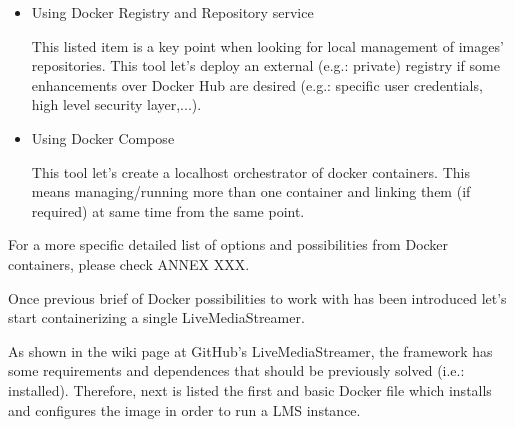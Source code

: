 \begin{itemize}
\begin{itemize}
	\item Using Docker Registry and Repository service

	This	 listed item is a key point when looking for local management of images' repositories. This tool let's deploy an external (e.g.: private) registry if some enhancements over Docker Hub are desired (e.g.: specific user credentials, high level security layer,...).
	
	\item Using Docker Compose
	
	This tool let's create a localhost orchestrator of docker containers. This means managing/running more than one container and linking them (if required) at same time from the same point.
	
	\end{itemize}
\end{itemize}

For a more specific detailed list of options and possibilities from Docker containers, please check ANNEX XXX.

Once previous brief of Docker possibilities to work with has been introduced let's start containerizing a single LiveMediaStreamer.

As shown in the wiki page at GitHub's LiveMediaStreamer, the framework has some requirements and dependences that should be previously solved (i.e.: installed). Therefore, next is listed the first and basic Docker file which installs and configures the image in order to run a LMS instance. 

